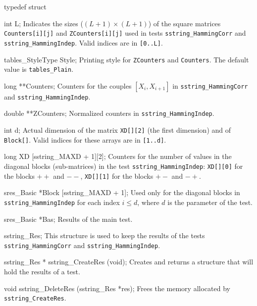 typedef struct {

   int L;
\endcode
 \tabb
  Indicates the sizes ($(L+1)\times (L+1)$) of the square matrices
  {\tt Counters[i][j]} and
  {\tt  ZCounters[i][j]} used in tests  {\tt sstring\_HammingCorr} and
 {\tt  sstring\_HammingIndep}. Valid indices are in {\tt [0..L]}.
 \endtabb
\code

   tables_StyleType Style;
\endcode
 \tabb
  Printing style for {\tt ZCounters} and  {\tt Counters}.
  The default value is {\tt tables\_Plain}.
 \endtabb
\code

   long **Counters;
\endcode
 \tabb
  Counters for the couples $[X_i, X_{i+1}]$ in {\tt sstring\_HammingCorr}
  and {\tt sstring\_HammingIndep}.
 \endtabb
\code

   double **ZCounters;
\endcode
 \tabb
  Normalized counters  in {\tt sstring\_HammingIndep}.
 \endtabb
\code

   int d;
\endcode
 \tabb
  Actual dimension of the matrix {\tt XD[][2]} (the first dimension)
  and of {\tt Block[]}. Valid indices for these arrays are in {\tt [1..d]}.
 \endtabb
\code

   long XD [sstring_MAXD + 1][2];
\endcode
 \tabb
  Counters for the number of values in the diagonal blocks
  (sub-matrices) in the test {\tt sstring\_HammingIndep}:
  {\tt XD[][0]} for the blocks $++$ and $--$,
  {\tt XD[][1]} for the blocks $+-$ and $-+$.
 \endtabb
\code

   sres_Basic *Block [sstring_MAXD + 1];
\endcode
 \tabb
   Used only for the diagonal blocks in {\tt sstring\_HammingIndep}
   for each index $i \le d$, where $d$ is the parameter of the test.
\endtabb
\code

   sres_Basic *Bas;
\endcode
 \tabb
  Results of the main test.
 \endtabb
\code

} sstring_Res;
\endcode
 \tab
  This structure is used to keep the results of the  tests
 {\tt sstring\_HammingCorr} and {\tt sstring\_Ham\-mingIndep}.
 \endtab
\code


sstring_Res * sstring_CreateRes (void);
\endcode
 \tab
  Creates and returns a structure that will hold the results of a test.
 \endtab
\code


void sstring_DeleteRes (sstring_Res *res);
\endcode
 \tab
  Frees the memory allocated by {\tt sstring\_CreateRes}.
 \endtab

\fi   %



